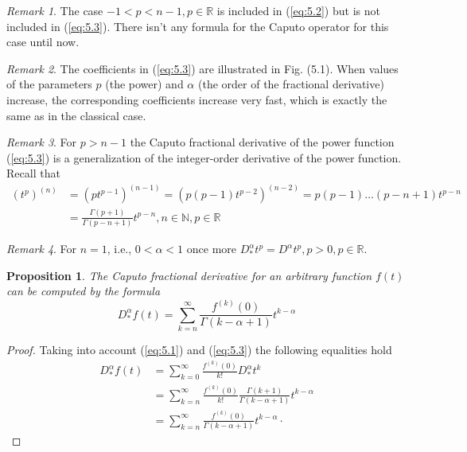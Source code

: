 \documentclass[a4paper,14pt,oneside]{book}
\theoremstyle{plain}
\newtheorem{prop}[thm]{Proposition}
\theoremstyle{definition}
\theoremstyle{remark}
\newtheorem{rmk}{Remark}[section]
\begin{document}
\begin{center}
\begin{flushleft}
{\begin{rmk}
The case $-1<p<n-1, p \in \mathbb{R}$ is included in (\ref{eq:5.2}) but is not included in (\ref{eq:5.3}). There isn't any formula for the Caputo operator for this case until now.
\end{rmk}
\begin{rmk}
The coefficients in (\ref{eq:5.3}) are illustrated in Fig. (5.1). When values of the parameters $p$ (the power) and $\alpha$ (the order of the fractional derivative) increase, the corresponding coefficients increase very fast, which is exactly the same as in the classical case.
\end{rmk}
\begin{rmk}
For $p>n-1$ the Caputo fractional derivative of the power function (\ref{eq:5.3}) is a generalization of the integer-order derivative of the power function. Recall that
$$
\begin{aligned}
\left(t^{p}\right)^{(n)} &=\left(p t^{p-1}\right)^{(n-1)}=\left(p(p-1) t^{p-2}\right)^{(n-2)}=p(p-1) \ldots (p - n + 1) t^{p -n}\\
&=\frac{\Gamma(p+1)}{\Gamma(p-n+1)} t^{p-n}, n \in \mathbb{N}, p \in \mathbb{R}
\end{aligned}
$$
\end{rmk}
\begin{rmk}For $n=1$, i.e., $0<\alpha<1$ once more $D_{*}^{\alpha} t^{p}=D^{\alpha} t^{p}, p>0, p \in \mathbb{R}$.
\end{rmk}
\begin{prop}
The Caputo fractional derivative for an arbitrary function $f(t)$ can be computed by the formula
$$
D_{*}^{\alpha} f(t)=\sum_{k=n}^{\infty} \frac{f^{(k)}(0)}{\Gamma(k-\alpha+1)} t^{k-\alpha}
$$
\end{prop}
\begin{proof}
Taking into account (\ref{eq:5.1}) and (\ref{eq:5.3}) the following equalities hold
$$
\begin{aligned}
D_{*}^{\alpha} f(t)&=\sum_{k=0}^{\infty} \frac{f^{(k)}(0)}{k !} D_{*}^{\alpha} t^{k}\\  
&=\sum_{k=n}^{\infty} \frac{f^{(k)}(0)}{k !} \frac{\Gamma(k+1)}{\Gamma(k-\alpha+1)} t^{k-\alpha}\\ &=\sum_{k=n}^{\infty} \frac{f^{(k)}(0)}{\Gamma(k-\alpha+1)} t^{k-\alpha} \cdot
\end{aligned}
$$
\end{proof}
\begin{figure}
    \centering

\end{figure}}
\end{flushleft}
\end{center}
\end{document}
